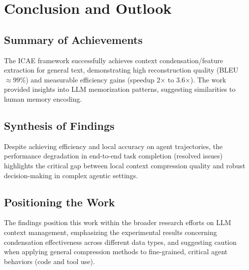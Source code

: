 \chapter{Conclusion and Outlook}


\section{Summary of Achievements}

The ICAE framework successfully achieves context condensation/feature extraction for general text, demonstrating high reconstruction quality (BLEU $\approx 99\%$) and measurable efficiency gains (speedup 2× to 3.6×). The work provided insights into LLM memorization patterns, suggesting similarities to human memory encoding.


\section{Synthesis of Findings}

Despite achieving efficiency and local accuracy on agent trajectories, the performance degradation in end-to-end task completion (resolved issues) highlights the critical gap between local context compression quality and robust decision-making in complex agentic settings.


\section{Positioning the Work}

The findings position this work within the broader research efforts on LLM context management, emphasizing the experimental results concerning condensation effectiveness across different data types, and suggesting caution when applying general compression methods to fine-grained, critical agent behaviors (code and tool use).
